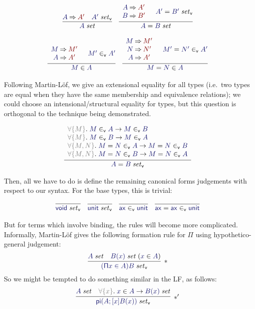 \documentclass[acmtoplas]{acmtrans2m}
\def\InputModeColorName{MidnightBlue}
\def\OutputModeColorName{Maroon}
\newcommand\InputMode[1]{{\color{\InputModeColorName}{#1}}}
\newcommand\OutputMode[1]{{\color{\OutputModeColorName}{#1}}}
\newcommand\tyvoid{\mathsf{void}}
\newcommand\tyunit{\mathsf{unit}}
\newcommand\ax{\mathsf{ax}}
\newcommand\eval[2]{\InputMode{#1}\mathbin{\Rightarrow}\OutputMode{#2}}
\newcommand\isset[1]{\InputMode{#1}\;\mathit{set}}
\newcommand\eqset[2]{\InputMode{#1}=\InputMode{#2}\;\mathit{set}}
\newcommand\mem[2]{\InputMode{#1}\in\InputMode{#2}}
\newcommand\eqmem[3]{\InputMode{#1}=\InputMode{#2}\in\InputMode{#3}}
\newcommand\canset[1]{\InputMode{#1}\;\mathit{set}_\mathsf{v}}
\newcommand\eqcanset[2]{\InputMode{#1}=\InputMode{#2}\;\mathit{set}_\mathsf{v}}
\newcommand\canmem[2]{\InputMode{#1}\in_\mathsf{v}\InputMode{#2}}
\newcommand\eqcanmem[3]{\InputMode{#1}=\InputMode{#2}\in_\mathsf{v}\InputMode{#3}}
\newcommand\lfpi[2]{{\color{Gray}\forall\{#1\}}.\;#2}
\DeclareMathOperator{\typi}{\mathsf{pi}}
\begin{document}
\begin{gather*}
  \infer{
    \isset{A}
  }{
    \eval{A}{A'} &
    \canset{A'}
  }\quad
  \infer{
    \eqset{A}{B}
  }{
    \begin{array}{c}
      \eval{A}{A'} \\
      \eval{B}{B'}
    \end{array} &
    \eqcanset{A'}{B'}
  }\\[6pt]
  \infer{
    \mem{M}{A}
  }{
    \begin{array}{c}
      \eval{M}{M'}\\
      \eval{A}{A'}
    \end{array} &
    \canmem{M'}{A'}
  }\quad
  \infer{
    \eqmem{M}{N}{A}
  }{
    \begin{array}{c}
      \eval{M}{M'} \\
      \eval{N}{N'} \\
      \eval{A}{A'}
    \end{array} &
    \eqcanmem{M'}{N'}{A'}
  }
\end{gather*}

Following Martin-L\"of, we give an extensional equality for all types (i.e.\
two types are equal when they have the same membership and equivalence
relations); we could choose an intensional/structural equality for types, but
this question is orthogonal to the technique being demonstrated.

\begin{gather*}
  \infer{
    \eqcanset{A}{B}
  }{
    \begin{array}{l}
      \lfpi{M}{\canmem{M}{A}\to\canmem{M}{B}}\\
      \lfpi{M}{\canmem{M}{B}\to\canmem{M}{A}}\\
      \lfpi{M,N}{\eqcanmem{M}{N}{A}\to\eqcanmem{M}{N}{B}}\\
      \lfpi{M,N}{\eqcanmem{M}{N}{B}\to\eqcanmem{M}{N}{A}}
    \end{array}
  }
\end{gather*}

Then, all we have to do is define the remaining canonical forms judgements with
respect to our syntax. For the base types, this is trivial:

\begin{gather*}
  \infer{
    \canset\tyvoid
  }{
  }\quad
  \infer{
    \canset\tyunit
  }{
  }\quad
  \infer{
    \canmem\ax\tyunit
  }{
  }\quad
  \infer{
    \eqcanmem\ax\ax\tyunit
  }{
  }
\end{gather*}

But for terms which involve binding, the rules will become more complicated.
Informally, Martin-L\"of gives the following formation rule for $\mathsf\Pi$
using hypothetico-general judgement:
\[
  \infer[*]{
    \canset{(\mathsf{\Pi}x\in A)B}
  }{
    \isset{A} &
    \isset{B(x)}\;(\mem{x}{A})
  }
\]
So we might be tempted to do something similar in the LF, as follows:
\[
  \infer[*']{
    \canset{\typi(A;[x]B(x))}
  }{
    \isset{A} &
    \lfpi{x}\mem{x}{A}\to\isset{B(x)}
  }
\]
\end{document}
